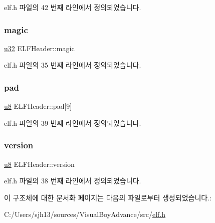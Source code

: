 elf.\+h 파일의 42 번째 라인에서 정의되었습니다.

\mbox{\label{struct_e_l_f_header_a5b65dfa66d5f45063e099e1bd8f7d39a}} 
\subsubsection{\texorpdfstring{magic}{magic}}
{\footnotesize\ttfamily \mbox{\hyperlink{_system_8h_a10e94b422ef0c20dcdec20d31a1f5049}{u32}} E\+L\+F\+Header\+::magic}



elf.\+h 파일의 35 번째 라인에서 정의되었습니다.

\mbox{\label{struct_e_l_f_header_a031107283881d74df8f63a4bccd7cce1}} 
\subsubsection{\texorpdfstring{pad}{pad}}
{\footnotesize\ttfamily \mbox{\hyperlink{_system_8h_aed742c436da53c1080638ce6ef7d13de}{u8}} E\+L\+F\+Header\+::pad\mbox{[}9\mbox{]}}



elf.\+h 파일의 39 번째 라인에서 정의되었습니다.

\mbox{\label{struct_e_l_f_header_aadac9bc05322252d95cff920e133ca15}} 
\subsubsection{\texorpdfstring{version}{version}}
{\footnotesize\ttfamily \mbox{\hyperlink{_system_8h_aed742c436da53c1080638ce6ef7d13de}{u8}} E\+L\+F\+Header\+::version}



elf.\+h 파일의 38 번째 라인에서 정의되었습니다.



이 구조체에 대한 문서화 페이지는 다음의 파일로부터 생성되었습니다.\+:\begin{DoxyCompactItemize}
\item 
C\+:/\+Users/sjh13/sources/\+Visual\+Boy\+Advance/src/\mbox{\hyperlink{elf_8h}{elf.\+h}}\end{DoxyCompactItemize}
